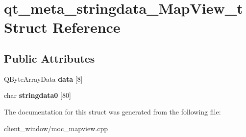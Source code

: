 \hypertarget{structqt__meta__stringdata__MapView__t}{}\section{qt\+\_\+meta\+\_\+stringdata\+\_\+\+Map\+View\+\_\+t Struct Reference}
\label{structqt__meta__stringdata__MapView__t}
\subsection*{Public Attributes}
\begin{DoxyCompactItemize}
\item 
Q\+Byte\+Array\+Data {\bfseries data} \mbox{[}8\mbox{]}\hypertarget{structqt__meta__stringdata__MapView__t_ae5a16a6d7bcdccd258d6efa0d628bdcf}{}\label{structqt__meta__stringdata__MapView__t_ae5a16a6d7bcdccd258d6efa0d628bdcf}

\item 
char {\bfseries stringdata0} \mbox{[}80\mbox{]}\hypertarget{structqt__meta__stringdata__MapView__t_a257b74af901514c7ea4760dc83d3f7d6}{}\label{structqt__meta__stringdata__MapView__t_a257b74af901514c7ea4760dc83d3f7d6}

\end{DoxyCompactItemize}


The documentation for this struct was generated from the following file\+:\begin{DoxyCompactItemize}
\item 
client\+\_\+window/moc\+\_\+mapview.\+cpp\end{DoxyCompactItemize}
